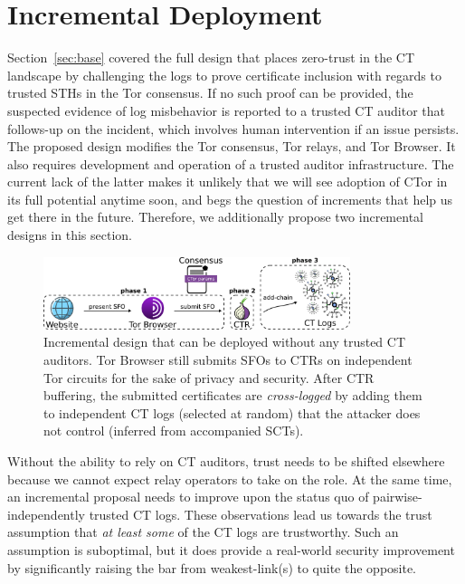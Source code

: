 \section{Incremental Deployment} \label{sec:incremental} 
Section~\ref{sec:base} covered the full design that places zero-trust in the CT
landscape by challenging the logs to prove certificate inclusion with regards to
trusted STHs in the Tor consensus.  If no such proof can be provided, the
suspected evidence of log misbehavior is reported to a trusted CT auditor that
follows-up on the incident, which involves human intervention if an issue
persists.  The proposed design modifies the Tor consensus, Tor relays, and Tor
Browser.  It also requires development and operation of a trusted auditor
infrastructure.  The current lack of the latter makes it unlikely that we will
see adoption of CTor in its full potential anytime soon, and begs the question
of increments that help us get there in the future. Therefore, we additionally
propose two incremental designs in this section.

\begin{figure}
    \centering
	\includegraphics[width=0.8\textwidth]{img/design-incremental}
	\vspace{-8px}
	\caption{%
		Incremental design that can be deployed without any
		trusted CT auditors.  Tor Browser still submits SFOs to CTRs on
		independent Tor circuits for the sake of privacy and security.  After
		CTR buffering, the submitted certificates are \emph{cross-logged} by
		adding them to independent CT logs (selected at random) that the
		attacker does not control (inferred from accompanied SCTs).
	}
	\label{fig:cross-log}
	\vspace{-10px}
\end{figure}

Without the ability to rely on CT auditors, trust needs to be shifted elsewhere
because we cannot expect relay operators to take on the role.  At the same time,
an incremental proposal needs to improve upon the status quo of
pairwise-independently trusted CT logs. These observations lead us towards the
trust assumption that \emph{at least some} of the CT logs are trustworthy. Such
an assumption is suboptimal, but it does provide a real-world security
improvement by significantly raising the bar from weakest-link(s) to quite the
opposite.

